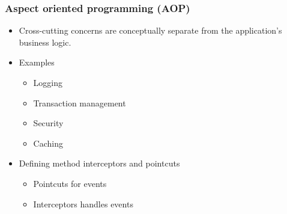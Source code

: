 \documentclass[10pt,xcolor=pdflatex, table]{beamer}
\begin{document}
\begin{frame}\frametitle{Aspect oriented programming (AOP)}
	\begin{itemize}
		\item Cross-cutting concerns are conceptually separate from the application's business logic.
		\item Examples
          \begin{itemize}
        	\item Logging
        	\item Transaction management
        	\item Security
        	\item Caching
          \end{itemize}
		\item Defining method interceptors and pointcuts
          \begin{itemize}
            \item Pointcuts for events
            \item Interceptors handles events
          \end{itemize}
	\end{itemize}
\end{frame}
\end{document}
